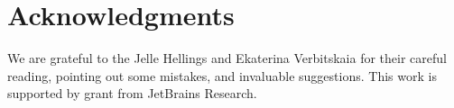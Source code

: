 \section*{Acknowledgments}

We are grateful to the Jelle Hellings and Ekaterina Verbitskaia for their careful reading, pointing out some mistakes, and invaluable suggestions.
This work is supported by grant from JetBrains Research.
